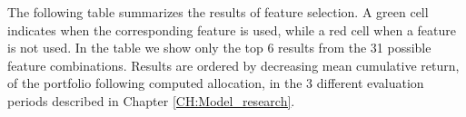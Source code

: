 The following table summarizes the results of feature selection. A green cell indicates when the corresponding feature is used, while a red cell when a feature is not used. In the table we show only the top 6 results from the 31 possible feature combinations. Results are ordered by decreasing mean cumulative return, of the portfolio following computed allocation, in the 3 different evaluation periods described in Chapter \ref{CH:Model_research}.

\begin{table}[h]
\end{table}
